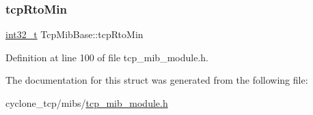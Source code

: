 \subsubsection{\texorpdfstring{tcp\+Rto\+Min}{tcpRtoMin}}
{\footnotesize\ttfamily \hyperlink{stdint_8h_ab1967d8591af1a4e48c37fd2b0f184d0}{int32\+\_\+t} Tcp\+Mib\+Base\+::tcp\+Rto\+Min}



Definition at line 100 of file tcp\+\_\+mib\+\_\+module.\+h.



The documentation for this struct was generated from the following file\+:\begin{DoxyCompactItemize}
\item 
cyclone\+\_\+tcp/mibs/\hyperlink{tcp__mib__module_8h}{tcp\+\_\+mib\+\_\+module.\+h}\end{DoxyCompactItemize}
